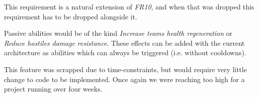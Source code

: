 \begin{table}[H]
\end{table}

This requirement is a natural extension of \emph{FR10}, and when that was 
dropped this requirement has to be dropped alongside it.

\begin{table}[H]
\end{table}

Passive abilities would be of the kind \emph{Increase teams health 
regeneration} or \emph{Reduce hostiles damage resistance}.  These effects can
be added with the current architecture as abilities which can always be 
triggered (i.e. without cooldowns).

This feature was scrapped due to time-constraints, but would require very 
little change to code to be implemented. Once again we were reaching too high
for a project running over four weeks.
